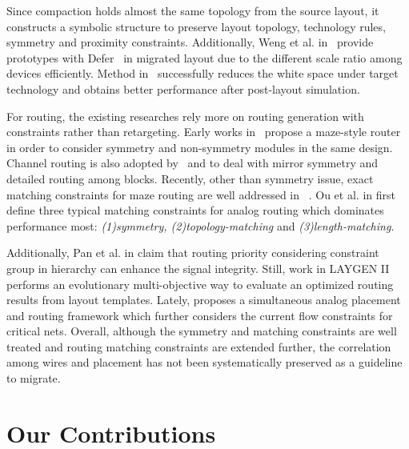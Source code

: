       Since compaction holds almost the same topology from the source layout, it constructs a symbolic structure to preserve layout topology, technology rules, symmetry and proximity constraints. Additionally, Weng et al. in~\cite{ALP_YPWeng_iccad2011} provide prototypes with Defer~\cite{defer_jackey_tcad10} in migrated layout due to the different scale ratio among devices efficiently. Method in~\cite{ALP_YPWeng_iccad2011} successfully reduces the white space under target technology and obtains better performance after post-layout simulation. 

      For routing, the existing researches rely more on routing generation with constraints rather than retargeting. Early works in~\cite{KOAN_ANAGRAMII-JSSC1991,aicon_malE_tcad96,ppraic_Linfu_iccad2010} propose a maze-style router in order to consider symmetry and non-symmetry modules in the same design. Channel routing is also adopted by~\cite{cbcrams_UChoudhury_tcad93} and \cite{aicon_malE_tcad96} to deal with mirror symmetry and detailed routing among blocks. Recently, other than symmetry issue, exact matching constraints for maze routing are well addressed in ~\cite{ermams_MMOzdal_tcad09}. Ou et al. in \cite{numarmc_HCOu_dac12} first define three typical matching constraints for analog routing which dominates performance most: {\it(1)symmetry, (2)topology-matching} and {\it (3)length-matching}. 

      Additionally, Pan et al. in \cite{Pan_CGR_ICCAD2012} claim that routing priority considering constraint group in hierarchy can enhance the signal integrity. Still, work in LAYGEN II \cite{LAYGENII_TCAD13} performs an evolutionary multi-objective way to evaluate an optimized routing results from layout templates. Lately, \cite{SAPR_DAC13} proposes a simultaneous analog placement and routing framework which further considers the current flow constraints for critical nets. Overall, although the symmetry and matching constraints are well treated and routing matching constraints are extended further, the correlation among wires and placement has not been systematically preserved as a guideline to migrate.

  \section{Our Contributions}\label{sec:contribution}

